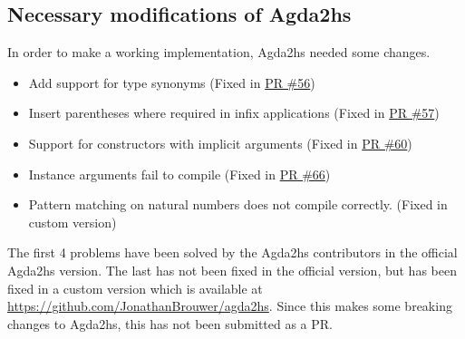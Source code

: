 \subsection{Necessary modifications of Agda2hs}
In order to make a working implementation, Agda2hs needed some changes.
\begin{itemize}
    \item Add support for type synonyms (Fixed in \textcolor{blue}{\href{https://github.com/agda/agda2hs/pull/56/}{PR \#56}})
    \item Insert parentheses where required in infix applications (Fixed in  \textcolor{blue}{\href{https://github.com/agda/agda2hs/pull/57/}{PR \#57}})
    \item Support for constructors with implicit arguments (Fixed in  \textcolor{blue}{\href{https://github.com/agda/agda2hs/pull/60/}{PR \#60}})
    \item Instance arguments fail to compile (Fixed in  \textcolor{blue}{\href{https://github.com/agda/agda2hs/pull/66/}{PR \#66}})
    \item Pattern matching on natural numbers does not compile correctly. (Fixed in custom version)
\end{itemize}
The first 4 problems have been solved by the Agda2hs contributors in the official Agda2hs version. The last has not been fixed in the official version, but has been fixed in a custom version which is available at \textcolor{blue}{\href{https://github.com/JonathanBrouwer/agda2hs}{https://github.com/JonathanBrouwer/agda2hs}}. Since this makes some breaking changes to Agda2hs, this has not been submitted as a PR.